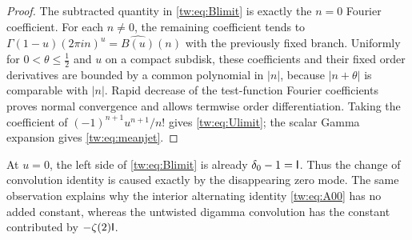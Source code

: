\begin{proof}
The subtracted quantity in \eqref{tw:eq:Blimit} is exactly the
$n=0$ Fourier coefficient. For each $n\ne0$, the remaining
coefficient tends to
$\Gamma(1-u)(2\pi in)^u=\widehat{B(u)}(n)$ with the previously
fixed branch. Uniformly for $0<\theta\le\tfrac12$ and $u$ on a
compact subdisk, these coefficients and their fixed order
derivatives are bounded by a common polynomial in $|n|$, because
$|n+\theta|$ is comparable with $|n|$. Rapid decrease of the
test-function Fourier coefficients proves normal convergence and
allows termwise order differentiation. Taking the coefficient of
$(-1)^{n+1}u^{n+1}/n!$ gives \eqref{tw:eq:Ulimit}; the scalar
Gamma expansion gives \eqref{tw:eq:meanjet}.
\end{proof}

At $u=0$, the left side of \eqref{tw:eq:Blimit} is already
$\delta_0-1=\mathsf I$. Thus the change of convolution identity is
caused exactly by the disappearing zero mode. The same observation
explains why the interior alternating identity
\eqref{tw:eq:A00} has no added constant, whereas the untwisted
digamma convolution has the constant contributed by
$-\zeta(2)\mathsf I$.
